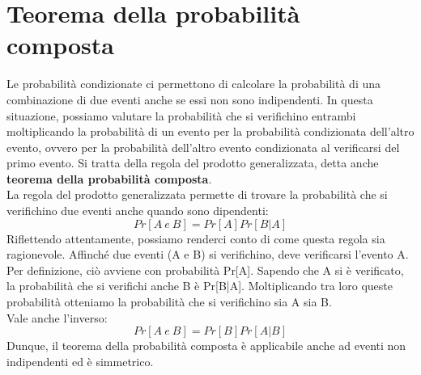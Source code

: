 \documentclass[10pt, draft]{book}
\begin{document}
\section{Teorema della probabilità composta}
Le probabilità condizionate ci permettono di calcolare la probabilità di una combinazione di due eventi anche se essi non sono indipendenti. In questa situazione, possiamo valutare la probabilità che si verifichino entrambi moltiplicando la probabilità di un evento per la probabilità condizionata dell'altro evento, ovvero per la probabilità dell'altro evento condizionata al verificarsi del primo evento. Si tratta della regola del prodotto generalizzata, detta anche \textbf{teorema della probabilità composta}. 
\\
La regola del prodotto generalizzata permette di trovare la probabilità che si verifichino due eventi anche quando sono dipendenti: 
\begin{equation}
    Pr[A\ e\ B] = Pr[A] Pr[B|A]
\end{equation}
Riflettendo attentamente, possiamo renderci conto di come questa regola sia ragionevole. Affinché due eventi (A e B) si verifichino, deve verificarsi l'evento A. Per definizione, ciò avviene con probabilità Pr[A]. Sapendo che A si è verificato, la probabilità che si verifichi anche B è Pr[B|A]. Moltiplicando tra loro queste probabilità otteniamo la probabilità che si verifichino sia A sia B.
\\
Vale anche l'inverso:
\begin{equation}
    Pr[A\ e\ B] = Pr[B] Pr[A|B]
\end{equation}
Dunque, il teorema della probabilità composta è applicabile anche ad eventi non indipendenti ed è simmetrico.
\end{document}

